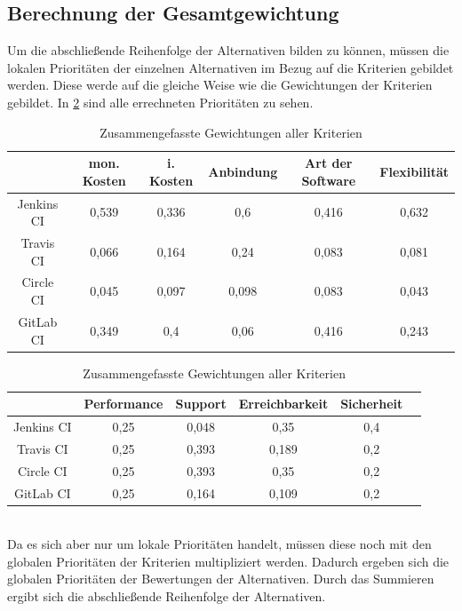 \subsection{Berechnung der Gesamtgewichtung}
Um die abschließende Reihenfolge der Alternativen bilden zu können, müssen die lokalen Prioritäten der einzelnen Alternativen im Bezug auf die Kriterien gebildet werden. Diese werde auf die gleiche Weise wie die Gewichtungen der Kriterien gebildet. In \ref{weight} sind alle errechneten Prioritäten zu sehen.
\begin{table}[h!]
	\centering
	\begin{tabular}{c|ccccc}
			 & mon. Kosten		& i. Kosten	 & Anbindung & Art der Software & Flexibilität   \\  
		\hline
		Jenkins CI   & 0,539    &        0,336        &      0,6       &      0,416   & 0,632 \\
		Travis CI &   0,066     & 0,164           &  0,24			&0,083 &  0,081  \\
		Circle CI   &   0,045    &  0,097   & 0,098           & 0,083 & 0,043\\
		GitLab CI    &    0,349   &  0,4 		  &        0,06      & 0,416        & 0,243 \\
	\end{tabular}
	\begin{tabular}{c|ccccc}
			&	Performance & Support & Erreichbarkeit &Sicherheit\\  
		\hline
		Jenkins CI      & 0,25  &        0,048    & 0,35    &  0,4  \\
		Travis CI &   0,25     & 0,393        &   0,189   &  0,2 \\
		Circle CI   &   0,25     &  0,393   &  0,35  &0,2 \\
		GitLab CI    &   0,25    &  0,164     &   0,109  & 0,2  \\
	\end{tabular}
	\caption{Zusammengefasste Gewichtungen aller Kriterien}
	\label{weight}
\end{table}\\
Da es sich aber nur um lokale Prioritäten handelt, müssen diese noch mit den globalen Prioritäten der Kriterien multipliziert werden. Dadurch ergeben sich die globalen Prioritäten der Bewertungen der Alternativen. Durch das Summieren ergibt sich die abschließende Reihenfolge der Alternativen.
